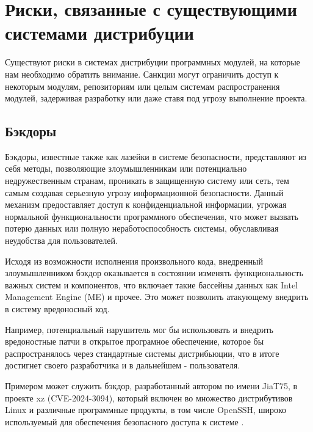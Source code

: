 \section{Риски, связанные с существующими системами дистрибуции}

Существуют риски в системах дистрибуции программных модулей, на которые нам необходимо обратить внимание. Санкции могут ограничить доступ к некоторым модулям, репозиториям или целым системам распространения модулей, задерживая разработку или даже ставя под угрозу выполнение проекта.

\subsection{Бэкдоры}


Бэкдоры, известные также как лазейки в системе безопасности, представляют из себя методы, позволяющие злоумышленникам или потенциально недружественным странам, проникать в защищенную систему или сеть, тем самым создавая серьезную угрозу информационной безопасности. Данный механизм предоставляет доступ к конфиденциальной информации, угрожая нормальной функциональности программного обеспечения, что может вызвать потерю данных или полную неработоспособность системы, обуславливая неудобства для пользователей.

Исходя из возможности исполнения произвольного кода, внедренный злоумышленником бэкдор оказывается в состоянии изменять функциональность важных систем и компонентов, что включает такие бассейны данных как Intel Management Engine (ME) и прочее. Это может позволить атакующему внедрить в систему вредоносный код.

Например, потенциальный нарушитель мог бы использовать и внедрить вредоностные патчи в открытое програмное обеспечение, которое бы распространялось через стандартные системы дистрибьюции, что в итоге достигнет своего разработчика и в дальнейшем - пользователя. 


Примером может служить бэкдор, разработанный автором по имени JiaT75, в проекте xz (CVE-2024-3094), который включен во множество дистрибутивов Linux и различные программные продукты, в том числе OpenSSH, широко используемый для обеспечения безопасного доступа к системе \cite{risk:xz_backdoor}. 

